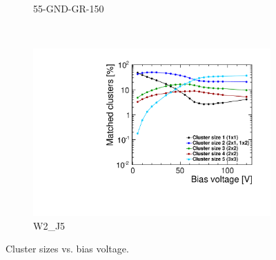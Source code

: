 \begin{figure}[htbp]
\begin{subfigure}[b]{0.33\textwidth}
    \caption{55-GND-GR-150}
  \end{subfigure}\\
  \begin{subfigure}[b]{0.33\textwidth}
    \includegraphics[width=\textwidth]{./figures/TestBeam/cluSize_biasScan_W0002_J05.pdf}
    \caption{W2\_J5}
  \end{subfigure}
  \caption{Cluster sizes vs. bias voltage.}
  \label{fig:clusterSize_vs_biasVoltage}
\end{figure}

